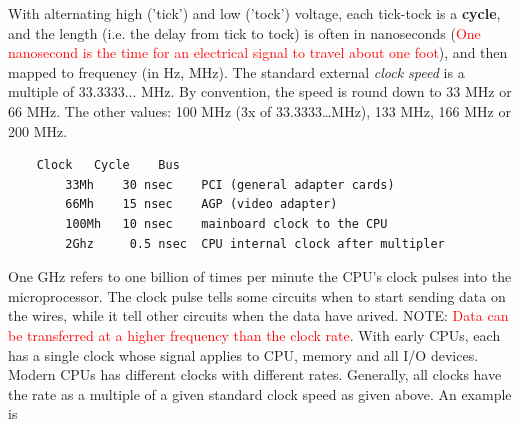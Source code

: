 With alternating high ('tick') and low ('tock') voltage, each tick-tock is a
{\bf cycle}, and the length (i.e. the delay from tick to tock) is often in
nanoseconds (\textcolor{red}{One nanosecond is the time for an electrical signal
to travel about one foot}), and then mapped to frequency (in Hz, MHz).
The standard external {\it clock speed} is a multiple of 33.3333...
MHz. By convention, the speed is round down to 33 MHz or 66 MHz. The other
values: 100 MHz (3x of 33.3333\ldots MHz), 133 MHz, 166 MHz or 200 MHz.
\begin{Verbatim}
    Clock   Cycle    Bus
        33Mh    30 nsec    PCI (general adapter cards)
        66Mh    15 nsec    AGP (video adapter)
        100Mh   10 nsec    mainboard clock to the CPU
        2Ghz     0.5 nsec  CPU internal clock after multipler
\end{Verbatim}
One GHz refers to one billion of times per minute the CPU's clock pulses into
the microprocessor. The clock pulse tells some circuits when to start sending data
on the wires, while it tell other circuits when the data have arived. NOTE:
\textcolor{red}{Data can be transferred at a higher frequency than the clock
rate}. With early CPUs, each has a single clock whose signal applies to CPU,
memory and all I/O devices. Modern CPUs has different clocks with different rates.
Generally, all clocks have the rate as a multiple of a given standard clock
speed as given above. An example is 
